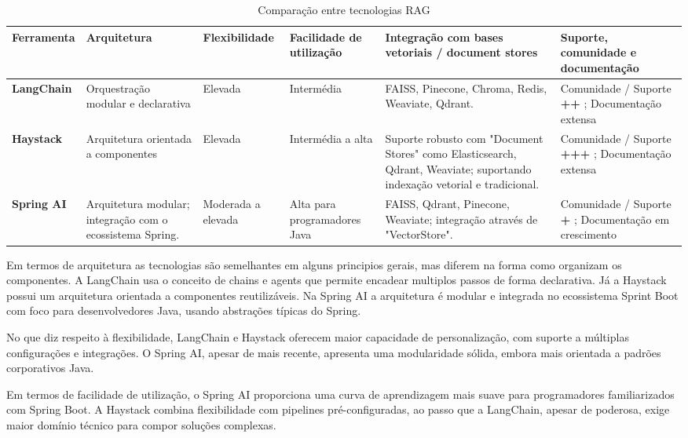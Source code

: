\begin{table}[H]
        \centering
        \caption{Comparação entre tecnologias RAG}
        \label{tab:tec-comp}
        \renewcommand{\arraystretch}{1.2}
        \begin{tabularx}{\textwidth}{|X|X|X|X|X|X|}
        \hline
        \textbf{Ferramenta} & \textbf{Arquitetura} & \textbf{Flexibilidade} & \textbf{Facilidade de utilização} & \textbf{Integração com bases vetoriais / document stores} & \textbf{Suporte, comunidade e documentação} \\
        \hline
        \textbf{LangChain} & Orquestração modular e declarativa & Elevada & Intermédia &  FAISS, Pinecone, Chroma, Redis, Weaviate, Qdrant. & Comunidade / Suporte \textbf{++} ; Documentação extensa \\
        \hline
        \textbf{Haystack} & Arquitetura orientada a componentes & Elevada & Intermédia a alta & Suporte robusto com "Document Stores" como Elasticsearch, Qdrant, Weaviate; suportando indexação vetorial e tradicional. & Comunidade / Suporte \textbf{+++} ; Documentação extensa \\
        \hline
        \textbf{Spring AI} & Arquitetura modular; integração com o ecossistema Spring. & Moderada a elevada & Alta para programadores Java & FAISS, Qdrant, Pinecone, Weaviate; integração através de "VectorStore". & Comunidade / Suporte \textbf{+} ; Documentação em crescimento  \\
        \hline
        \end{tabularx}
    \end{table}

Em termos de arquitetura as tecnologias são semelhantes em alguns principios gerais, mas diferem na forma como organizam os componentes. A LangChain usa o conceito de chains e agents que permite encadear multiplos passos de forma declarativa. Já a Haystack possui um arquitetura orientada a componentes reutilizáveis. Na Spring AI a arquitetura é modular e integrada no ecossistema Sprint Boot com foco para desenvolvedores Java, usando abstrações típicas do Spring. 


No que diz respeito à flexibilidade, LangChain e Haystack oferecem maior capacidade de personalização, com suporte a múltiplas configurações e integrações. O Spring AI, apesar de mais recente, apresenta uma modularidade sólida, embora mais orientada a padrões corporativos Java.

Em termos de facilidade de utilização, o Spring AI proporciona uma curva de aprendizagem mais suave para programadores familiarizados com Spring Boot. A Haystack combina flexibilidade com pipelines pré-configuradas, ao passo que a LangChain, apesar de poderosa, exige maior domínio técnico para compor soluções complexas.

